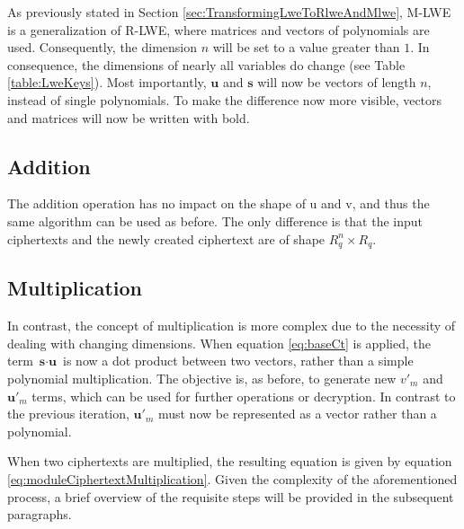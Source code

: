 As previously stated in Section \ref{sec:TransformingLweToRlweAndMlwe}, M-LWE is a generalization of R-LWE, where matrices and vectors of polynomials are used. Consequently, the dimension $n$ will be set to a value greater than $1$. In consequence, the dimensions of nearly all variables do change (see Table \ref{table:LweKeys}). Most importantly, $\textbf{u}$ and $\textbf{s}$ will now be vectors of length $n$, instead of single polynomials. To make the difference now more visible, vectors and matrices will now be written with bold.

\subsection*{Addition}

The addition operation has no impact on the shape of u and v, and thus the same algorithm can be used as before. The only difference is that the input ciphertexts and the newly created ciphertext are of shape $R_q^{n}\times R_q$.

\subsection*{Multiplication}

In contrast, the concept of multiplication is more complex due to the necessity of dealing with changing dimensions. When equation \ref{eq:baseCt} is applied, the term $\textbf{s}\cdot \textbf{u}$ is now a dot product between two vectors, rather than a simple polynomial multiplication. The objective is, as before, to generate new $v'_m$ and $\textbf{u}'_m$ terms, which can be used for further operations or decryption. In contrast to the previous iteration, $\textbf{u}'_m$ must now be represented as a vector rather than a polynomial.

When two ciphertexts are multiplied, the resulting equation is given by equation \ref{eq:moduleCiphertextMultiplication}. Given the complexity of the aforementioned process, a brief overview of the requisite steps will be provided in the subsequent paragraphs.

